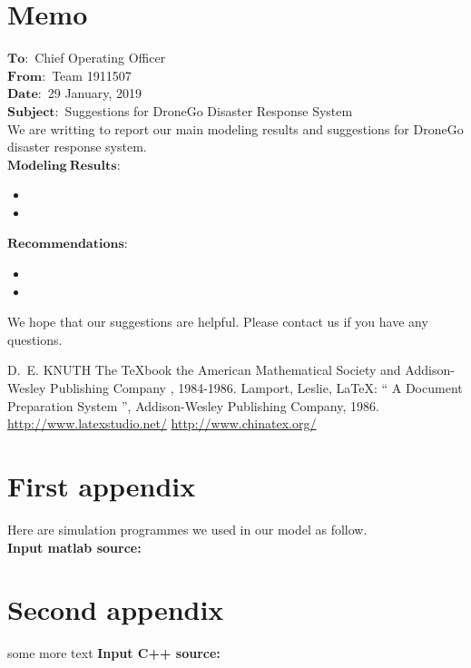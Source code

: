 \documentclass{mcmthesis}
\begin{document}
\section*{Memo}
$\mathbf{To:}$ Chief Operating Officer \\
$\mathbf{From:}$ Team 1911507\\
$\mathbf{Date:}$ 29 January, 2019\\
$\mathbf{Subject:}$ Suggestions for DroneGo Disaster Response System\\

\noindent We are writting to report our main modeling results and suggestions for  DroneGo disaster response system.\\

\noindent$\mathbf{Modeling}\ \mathbf{Results:}$
\begin{itemize}
	\item 
	\item 
\end{itemize}

\noindent$\mathbf{Recommendations:}$
\begin{itemize}
	\item 
	\item 
\end{itemize}

\noindent We hope that our suggestions are helpful. Please contact us if you have any questions.



\begin{thebibliography}{99}
 D.~E. KNUTH   The \TeX{}book  the American
Mathematical Society and Addison-Wesley
Publishing Company , 1984-1986.
Lamport, Leslie,  \LaTeX{}: `` A Document Preparation System '',
Addison-Wesley Publishing Company, 1986.
\url{http://www.latexstudio.net/}
\url{http://www.chinatex.org/}
\end{thebibliography}

\begin{appendices}

\section{First appendix}

\lipsum[13]

Here are simulation programmes we used in our model as follow.\\

\textbf{\textcolor[rgb]{0.98,0.00,0.00}{Input matlab source:}}


\section{Second appendix}

some more text \textcolor[rgb]{0.98,0.00,0.00}{\textbf{Input C++ source:}}


\end{appendices}
\end{document}
